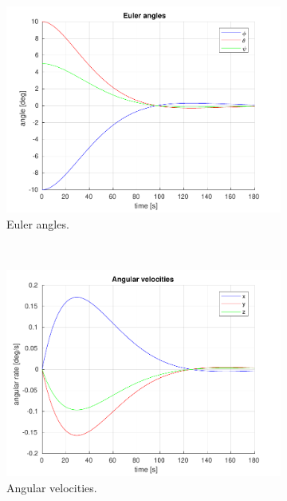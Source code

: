 \begin{figure}[ht]
	\centering
	\begin{subfigure}[b]{0.45\textwidth}
		\includegraphics[width=\textwidth]{1_3_euler_angles}
		\caption{Euler angles.}
		\label{fig:2a}
	\end{subfigure}
	~ %
	\begin{subfigure}[b]{0.45\textwidth}
		\includegraphics[width=\textwidth]{1_3_angular_velocities}
		\caption{Angular velocities.}
		\label{fig:2b}
	\end{subfigure}
	\begin{subfigure}[b]{0.45\textwidth}

\end{subfigure}
\end{figure}
